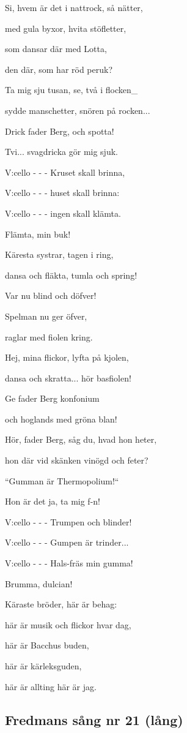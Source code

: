 Si, hvem är det i nattrock, så nätter,

med gula byxor, hvita stöfletter,

som dansar där med Lotta,

den där, som har röd peruk?

Ta mig sju tusan, se, två i flocken\_

sydde manschetter, snören på rocken...

Drick fader Berg, och spotta!

Tvi... svagdricka gör mig sjuk.

V:cello - - - Kruset skall brinna,

V:cello - - - huset skall brinna:

V:cello - - - ingen skall klämta.

Flämta, min buk!

Käresta systrar, tagen i ring,

dansa och fläkta, tumla och spring!

Var nu blind och döfver!

Spelman nu ger öfver,

raglar med fiolen kring.\bigskip



Hej, mina flickor, lyfta på kjolen,

dansa och skratta... hör basfiolen!

Ge fader Berg konfonium

och hoglands med gröna blan!

Hör, fader Berg, såg du, hvad hon heter,

hon där vid skänken vinögd och feter?

“Gumman är Thermopolium!“

Hon är det ja, ta mig f-n!

V:cello - - - Trumpen och blinder!

V:cello - - - Gumpen är trinder...

V:cello - - - Hals-fräs min gumma!

Brumma, dulcian!

Käraste bröder, här är behag:

här är musik och flickor hvar dag,

här är Bacchus buden,

här är kärleksguden,

här är allting här är jag. \bigskip

\subsection{\textbf{Fredmans sång nr 21 (lång)}}

